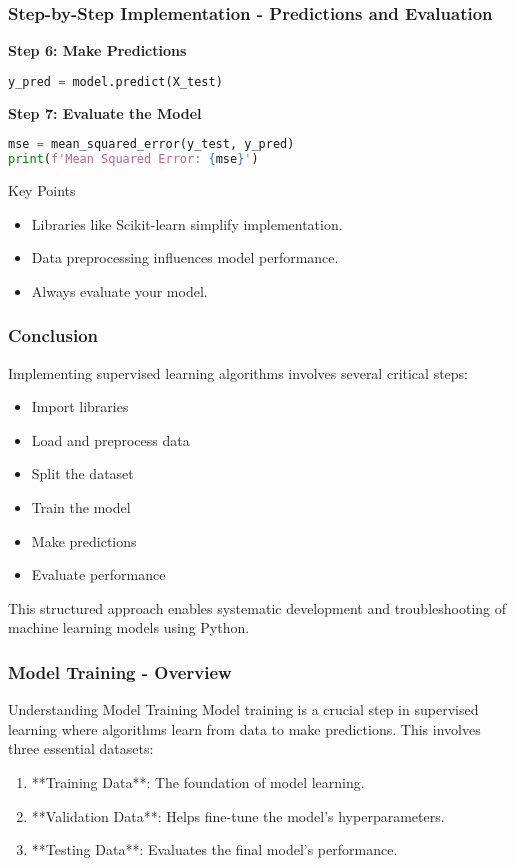 \documentclass[aspectratio=169]{beamer}
\begin{document}
\begin{frame}[fragile]
    \frametitle{Step-by-Step Implementation - Predictions and Evaluation}
    \textbf{Step 6: Make Predictions}
    \begin{lstlisting}[language=Python]
y_pred = model.predict(X_test)
    \end{lstlisting}

    \textbf{Step 7: Evaluate the Model}
    \begin{lstlisting}[language=Python]
mse = mean_squared_error(y_test, y_pred)
print(f'Mean Squared Error: {mse}')
    \end{lstlisting}

    \begin{block}{Key Points}
        \begin{itemize}
            \item Libraries like Scikit-learn simplify implementation.
            \item Data preprocessing influences model performance.
            \item Always evaluate your model.
        \end{itemize}
    \end{block}
\end{frame}

\begin{frame}[fragile]
    \frametitle{Conclusion}
    Implementing supervised learning algorithms involves several critical steps:
    \begin{itemize}
        \item Import libraries
        \item Load and preprocess data
        \item Split the dataset
        \item Train the model
        \item Make predictions
        \item Evaluate performance
    \end{itemize}
    This structured approach enables systematic development and troubleshooting of machine learning models using Python.
\end{frame}

\begin{frame}[fragile]
    \frametitle{Model Training - Overview}
    \begin{block}{Understanding Model Training}
    Model training is a crucial step in supervised learning where algorithms learn from data to make predictions.
    This involves three essential datasets:
    \end{block}

    \begin{enumerate}
        \item **Training Data**: The foundation of model learning.
        \item **Validation Data**: Helps fine-tune the model's hyperparameters.
        \item **Testing Data**: Evaluates the final model's performance.
    \end{enumerate}
\end{frame}
\end{document}
